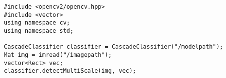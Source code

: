 \documentclass{ctexart}
\begin{document}
\begin{lstlisting}
#include <opencv2/opencv.hpp>
#include <vector>
using namespace cv;
using namespace std;

CascadeClassifier classifier = CascadeClassifier("/modelpath");
Mat img = imread("/imagepath");
vector<Rect> vec;
classifier.detectMultiScale(img, vec);
\end{lstlisting}
\end{document}
